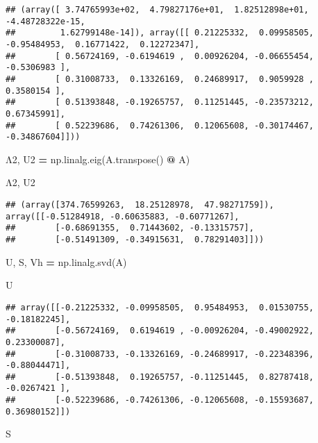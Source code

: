 \documentclass[]{article}
\newenvironment{Shaded}{\begin{snugshade}}{\end{snugshade}}
\newcommand{\NormalTok}[1]{#1}
\newcommand{\OperatorTok}[1]{\textcolor[rgb]{0.81,0.36,0.00}{\textbf{#1}}}
\begin{document}
\begin{verbatim}
## (array([ 3.74765993e+02,  4.79827176e+01,  1.82512898e+01, -4.48728322e-15,
##         1.62799148e-14]), array([[ 0.21225332,  0.09958505, -0.95484953,  0.16771422,  0.12272347],
##        [ 0.56724169, -0.6194619 ,  0.00926204, -0.06655454, -0.5306983 ],
##        [ 0.31008733,  0.13326169,  0.24689917,  0.9059928 ,  0.3580154 ],
##        [ 0.51393848, -0.19265757,  0.11251445, -0.23573212,  0.67345991],
##        [ 0.52239686,  0.74261306,  0.12065608, -0.30174467, -0.34867604]]))
\end{verbatim}

\begin{Shaded}
\begin{Highlighting}[]
\NormalTok{Λ2, U2 }\OperatorTok{=}\NormalTok{ np.linalg.eig(A.transpose() }\OperatorTok{@}\NormalTok{ A)}

\NormalTok{Λ2, U2}
\end{Highlighting}
\end{Shaded}

\begin{verbatim}
## (array([374.76599263,  18.25128978,  47.98271759]), array([[-0.51284918, -0.60635883, -0.60771267],
##        [-0.68691355,  0.71443602, -0.13315757],
##        [-0.51491309, -0.34915631,  0.78291403]]))
\end{verbatim}

\begin{Shaded}
\begin{Highlighting}[]
\NormalTok{U, S, Vh }\OperatorTok{=}\NormalTok{ np.linalg.svd(A)}

\NormalTok{U}
\end{Highlighting}
\end{Shaded}

\begin{verbatim}
## array([[-0.21225332, -0.09958505,  0.95484953,  0.01530755, -0.18182245],
##        [-0.56724169,  0.6194619 , -0.00926204, -0.49002922,  0.23300087],
##        [-0.31008733, -0.13326169, -0.24689917, -0.22348396, -0.88044471],
##        [-0.51393848,  0.19265757, -0.11251445,  0.82787418, -0.0267421 ],
##        [-0.52239686, -0.74261306, -0.12065608, -0.15593687,  0.36980152]])
\end{verbatim}

\begin{Shaded}
\begin{Highlighting}[]
\NormalTok{S}
\end{Highlighting}
\end{Shaded}
\end{document}
